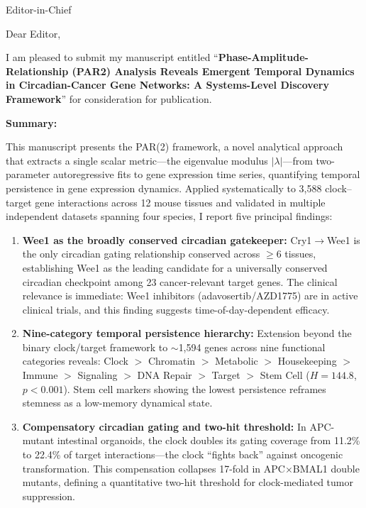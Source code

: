 \documentclass[11pt]{letter}
\begin{document}
\begin{letter}{Editor-in-Chief}

\opening{Dear Editor,}

I am pleased to submit my manuscript entitled ``\textbf{Phase-Amplitude-Relationship (PAR2) Analysis Reveals Emergent Temporal Dynamics in Circadian-Cancer Gene Networks: A Systems-Level Discovery Framework}'' for consideration for publication.

\textbf{Summary:}

This manuscript presents the PAR(2) framework, a novel analytical approach that extracts a single scalar metric---the eigenvalue modulus $|\lambda|$---from two-parameter autoregressive fits to gene expression time series, quantifying temporal persistence in gene expression dynamics. Applied systematically to 3,588 clock--target gene interactions across 12 mouse tissues and validated in multiple independent datasets spanning four species, I report five principal findings:

\begin{enumerate}
    \item \textbf{Wee1 as the broadly conserved circadian gatekeeper:} Cry1$\rightarrow$Wee1 is the only circadian gating relationship conserved across $\geq$6 tissues, establishing Wee1 as the leading candidate for a universally conserved circadian checkpoint among 23 cancer-relevant target genes. The clinical relevance is immediate: Wee1 inhibitors (adavosertib/AZD1775) are in active clinical trials, and this finding suggests time-of-day-dependent efficacy.

    \item \textbf{Nine-category temporal persistence hierarchy:} Extension beyond the binary clock/target framework to $\sim$1,594 genes across nine functional categories reveals: Clock $>$ Chromatin $>$ Metabolic $>$ Housekeeping $>$ Immune $>$ Signaling $>$ DNA Repair $>$ Target $>$ Stem Cell ($H=144.8$, $p<0.001$). Stem cell markers showing the lowest persistence reframes stemness as a low-memory dynamical state.

    \item \textbf{Compensatory circadian gating and two-hit threshold:} In APC-mutant intestinal organoids, the clock doubles its gating coverage from 11.2\% to 22.4\% of target interactions---the clock ``fights back'' against oncogenic transformation. This compensation collapses 17-fold in APC$\times$BMAL1 double mutants, defining a quantitative two-hit threshold for clock-mediated tumor suppression.


\end{enumerate}
\end{letter}
\end{document}
